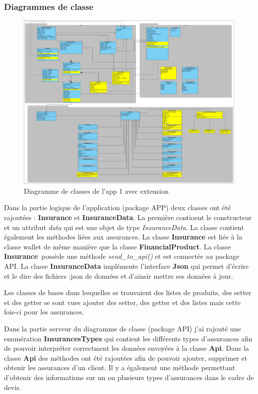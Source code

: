 \documentclass[../rapport.tex]{subfiles}
\begin{document}
		\subsubsection{Diagrammes de classe}
				\begin{figure}[h]
						\centering\includegraphics[scale=0.15]{ressources/photos_diagrammes/extensionThomas/class1ExtensionThomas.jpg}
						\caption{Diagramme de classes de l'app 1 avec extension}
				\end{figure}
		Dans la partie logique de l'application (package APP) deux classes ont été rajoutées :
		\textbf{Insurance} et \textbf{InsuranceData}. La première contioent le constructeur et 
		un attribut \textit{data} qui est une objet de type \textit{InsuranceData}. La classe 
		contient également les méthodes liées aux assurances. La classe \textbf{Insurance} est
		liée à la classe wallet de même manière que la classe \textbf{FinancialProduct}. 
		La classe \textbf{Insurance} possède une méthode \textit{send\_to\_api()} et est connectée 
		au package API. La classe \textbf{InsuranceData} implémente l'interface \textbf{Json} qui
		permet d'écrire et le dire des fichiers :json de données et d'ainsir mettre ses données à
		jour.

		\medskip

		Les classes de bases dans lesquelles se trouvaient des listes de produits, des setter et 
		des getter se sont vues ajouter des setter, des getter et des listes mais cette fois-ci
		pour les assurances. 

		\bigskip

		Dans la partie serveur du diagramme de classe (package API) j'ai rajouté une enumération
		\textbf{InsurancesTypes} qui contient les différents types d'assurances afin de pouvoir
		interpréter correctment les données envoyées à la classe \textbf{Api}. Dans la classe
		\textbf{Api} des méthodes ont été rajoutées afin de pouvoir ajouter, supprimer et obtenir
		les assurances d'un client. Il y a également une méthode permettant d'obtenir des 
		informations sur un ou plusieurs types d'assurances dans le cadre de devis.
\end{document}

